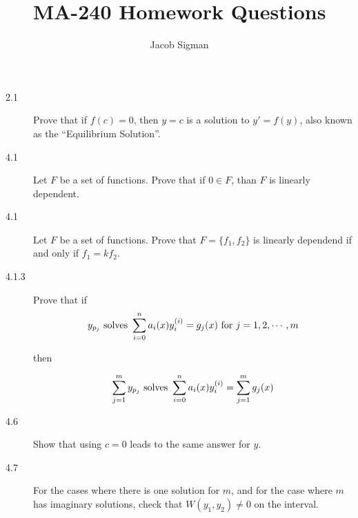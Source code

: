 \documentclass{article}
\title{MA-240 Homework Questions}
\author{Jacob Sigman}
\date{}
\begin{document}
\maketitle

\begin{description}
    \item [2.1] Prove that if \(f(c)=0\), then \(y=c\) is a solution to \(y'=f(y)\), also known as the ``Equilibrium Solution''.
    \item [4.1] Let \(F\) be a set of functions. Prove that if \(0 \in F\), than \(F\) is linearly dependent.
    \item [4.1] Let \(F\) be a set of functions. Prove that \(F=\{f_1,f_2\}\) is linearly dependend if and only if \(f_1=kf_2\).
    \item [4.1.3] Prove that if \[y_{p_j} \textnormal{ solves }\sum_{i=0}^na_i(x)y_{i}^{(i)}=g_j(x)\textnormal{ for } j=1,2,\cdots, m\] \begin{center}then\end{center} \[\sum_{j=1}^my_{p_j}\textnormal{ solves }\sum_{i=0}^na_i(x)y_i^{(i)}=\sum_{j=1}^mg_j(x)\]
    \item [4.6] Show that using \(c=0\) leads to the same answer for \(y\).
    \item [4.7] For the cases where there is one solution for \(m\), and for the case where \(m\) has imaginary solutions, check that \(W(y_1,y_2)\neq 0\) on the interval.
\end{description}
\end{document}
